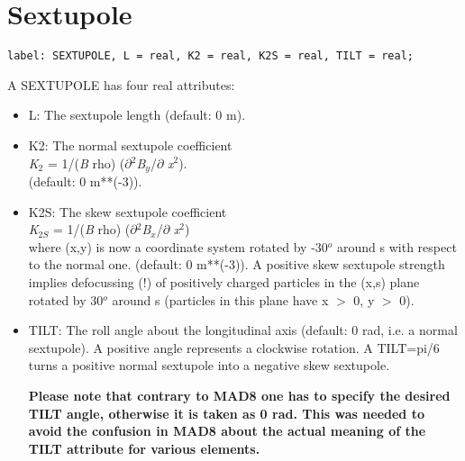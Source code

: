 
\section{Sextupole}
\label{sec:sextupole}

\begin{verbatim}
label: SEXTUPOLE, L = real, K2 = real, K2S = real, TILT = real;
\end{verbatim} 

A SEXTUPOLE has four real attributes: 
\begin{itemize}
    \item L: The sextupole length (default: 0 m). 
    \item K2: The normal sextupole coefficient \\
      \textit{K}$_2$ = 1/(\textit{B} rho)
      ($\partial$$^2$\textit{B$_y$}/$\partial$ \textit{x}$^2$). \\       
      (default: 0 m**(-3)). 
    \item K2S: The skew sextupole coefficient \\
      \textit{K}$_{2S}$ = 1/(\textit{B} rho)
      ($\partial$$^2$\textit{B$_x$}/$\partial$ \textit{x}$^2$)
      \\
      where (x,y) is now a coordinate system rotated by -30$^o$ around s with
      respect to the normal one. (default: 0 m**(-3)). A positive skew
      sextupole strength implies defocussing (!) of positively charged
      particles in the (x,s) plane rotated by 30$^o$ around s (particles in
      this plane have x $>$ 0, y $>$ 0).  


    \item TILT: The roll angle about the longitudinal axis (default: 0
      rad, i.e. a normal sextupole). A positive angle represents a
      clockwise rotation. A TILT=pi/6 turns a positive normal sextupole
      into a negative skew sextupole.
      
      \textbf{  Please note that contrary to MAD8 one has to specify the
        desired TILT angle, otherwise it is taken as 0 rad. This was needed to
        avoid the confusion in MAD8 about the actual meaning of the TILT
        attribute for various elements. } 
\end{itemize}

